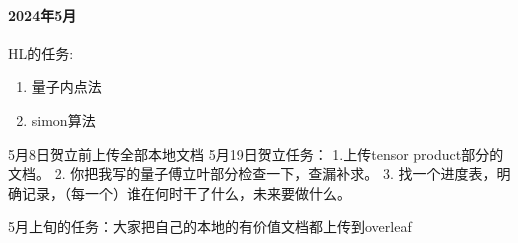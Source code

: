 \paragraph{2024年5月}HL的任务:
\begin{enumerate}
    \item 量子内点法
    \item simon算法
\end{enumerate}

5月8日贺立前上传全部本地文档
5月19日贺立任务：
1.上传tensor product部分的文档。
2. 你把我写的量子傅立叶部分检查一下，查漏补求。
3. 找一个进度表，明确记录，（每一个）谁在何时干了什么，未来要做什么。

5月上旬的任务：大家把自己的本地的有价值文档都上传到overleaf